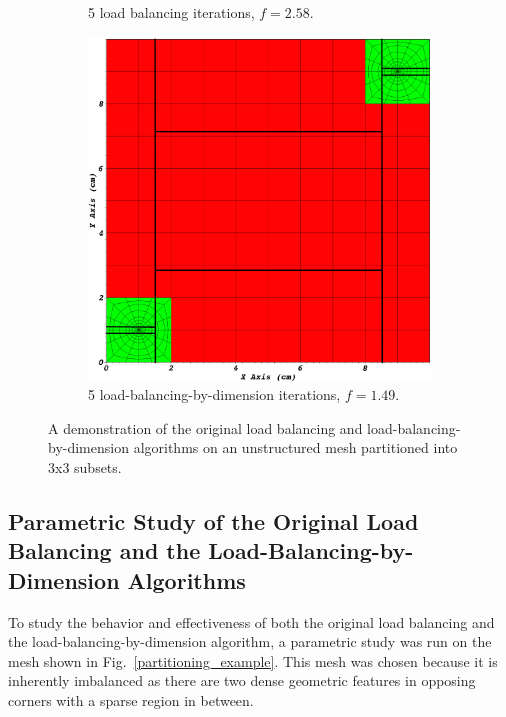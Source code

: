 \documentclass[times,final]{elsarticle}
\begin{document}
\begin{figure}[H]
\begin{subfigure}[b]{0.49\textwidth}
\caption{5 load balancing iterations, $f = 2.58$.}
\label{3x3_lb}
\end{subfigure}
\begin{subfigure}[b]{0.49\textwidth}
\centering
\includegraphics[scale=0.13]{../figures/ubp_3x3_lbd.png}
\caption{5 load-balancing-by-dimension iterations, $f = 1.49$.}
\label{3x3_lbd}
\end{subfigure}
\caption{A demonstration of the original load balancing and load-balancing-by-dimension algorithms on an unstructured mesh partitioned into 3x3 subsets.}
\label{alg_illustration}
\end{figure}

\subsection{Parametric Study of the Original Load Balancing and the Load-Balancing-by-Dimension Algorithms}
To study the behavior and effectiveness of both the original load balancing and the load-balancing-by-dimension algorithm, a parametric study was run on the mesh shown in Fig.~\ref{partitioning_example}.
This mesh was chosen because it is inherently imbalanced as there are two dense geometric features in opposing corners with a sparse region in between.
\end{document}
